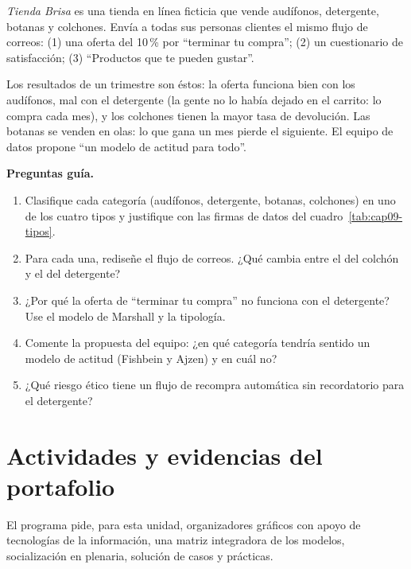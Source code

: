 \begin{casoFicticio}
\textit{Tienda Brisa} es una tienda en línea ficticia que vende audífonos,
detergente, botanas y colchones. Envía a todas sus personas clientes el mismo
flujo de correos: (1) una oferta del 10\,\% por \enquote{terminar tu compra}; (2)
un cuestionario de satisfacción; (3) \enquote{Productos que te pueden gustar}.

Los resultados de un trimestre son éstos: la oferta funciona bien con los
audífonos, mal con el detergente (la gente no lo había dejado en el carrito: lo
compra cada mes), y los colchones tienen la mayor tasa de devolución. Las botanas
se venden en olas: lo que gana un mes pierde el siguiente. El equipo de datos
propone \enquote{un modelo de actitud para todo}.

\textbf{Preguntas guía.}
\begin{enumerate}
  \item Clasifique cada categoría (audífonos, detergente, botanas, colchones)
  en uno de los cuatro tipos y justifique con las firmas de datos del
  cuadro~\ref{tab:cap09-tipos}.
  \item Para cada una, rediseñe el flujo de correos. ¿Qué cambia entre el del
  colchón y el del detergente?
  \item ¿Por qué la oferta de \enquote{terminar tu compra} no funciona con el
  detergente? Use el modelo de Marshall y la tipología.
  \item Comente la propuesta del equipo: ¿en qué categoría tendría sentido un
  modelo de actitud (Fishbein y Ajzen) y en cuál no?
  \item ¿Qué riesgo ético tiene un flujo de recompra automática sin
  recordatorio para el detergente?
\end{enumerate}
\end{casoFicticio}

\section{Actividades y evidencias del portafolio}

El programa pide, para esta unidad, organizadores gráficos con apoyo de
tecnologías de la información, una matriz integradora de los modelos, socialización
en plenaria, solución de casos y prácticas.

